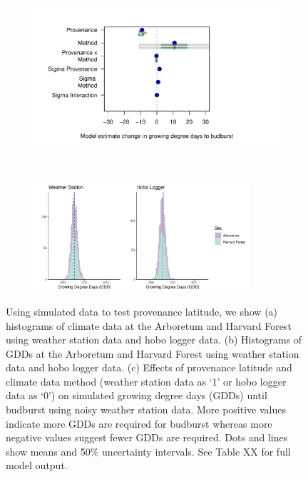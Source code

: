 \documentclass{article}\usepackage[]{graphicx}\usepackage[]{color}
\begin{document}
  
\begin{figure}
    \begin{subfigure}{.5\linewidth}
      \caption{}
      \centering
      \includegraphics[height=7cm, width=11cm]{..//analyses/figures/muplot_prov.pdf}
      \label{fig:muplotprov}
    \end{subfigure}
  \begin{subfigure}{.5\linewidth}
	    \caption{}
      \centering
      \includegraphics[height=4cm, width=8cm]{..//analyses/figures/gdd_methods_prov.pdf}
    \label{fig:gddprov}
  \end{subfigure}
\caption{ Using simulated data to test provenance latitude, we show (a) histograms of climate data at the Arboretum and Harvard Forest using weather station data and hobo logger data. (b) Histograms of GDDs at the Arboretum and Harvard Forest using weather station data and hobo logger data. (c) Effects of provenance latitude and climate data method (weather station data as `1' or hobo logger data as `0') on simulated growing degree days (GDDs) until budburst using noisy weather station data. More positive values indicate more GDDs are required for budburst whereas more negative values suggest fewer GDDs are required. Dots and lines show means and 50\% uncertainty intervals. See Table XX for full model output.}
\label{fig:prov}
\end{figure}
\end{document}
